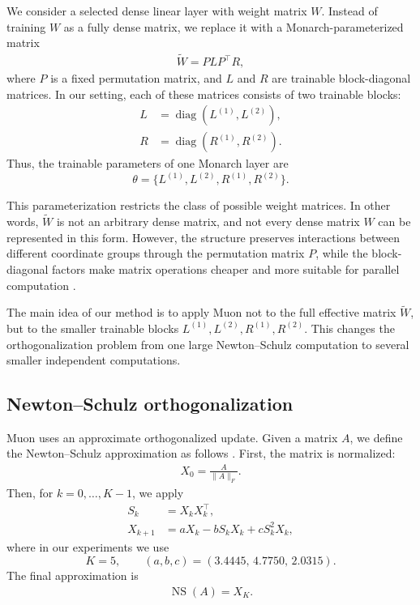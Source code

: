 \documentclass{article}
\begin{document}
We consider a selected dense linear layer with weight matrix \(W\). Instead of training \(W\) as a fully dense matrix, we replace it with a Monarch-parameterized matrix \cite{dao2022monarchexpressivestructuredmatrices}
\begin{align}
\widetilde{W} = P L P^\top R,
\end{align}
where \(P\) is a fixed permutation matrix, and \(L\) and \(R\) are trainable block-diagonal matrices. In our setting, each of these matrices consists of two trainable blocks:
\begin{align}
L &= \operatorname{diag}(L^{(1)}, L^{(2)}), \\
R &= \operatorname{diag}(R^{(1)}, R^{(2)}).
\end{align}
Thus, the trainable parameters of one Monarch layer are
\[
\theta = \{L^{(1)}, L^{(2)}, R^{(1)}, R^{(2)}\}.
\]

This parameterization restricts the class of possible weight matrices. In other words, \(\widetilde{W}\) is not an arbitrary dense matrix, and not every dense matrix \(W\) can be represented in this form. However, the structure preserves interactions between different coordinate groups through the permutation matrix \(P\), while the block-diagonal factors make matrix operations cheaper and more suitable for parallel computation \cite{dao2022monarchexpressivestructuredmatrices}.

The main idea of our method is to apply Muon not to the full effective matrix \(\widetilde{W}\), but to the smaller trainable blocks \(L^{(1)}, L^{(2)}, R^{(1)}, R^{(2)}\). This changes the orthogonalization problem from one large Newton--Schulz computation to several smaller independent computations.

\subsection{Newton--Schulz orthogonalization}

Muon uses an approximate orthogonalized update. Given a matrix \(A\), we define the Newton--Schulz approximation as follows \cite{jordan2024muon,liu2025muonscalablellmtraining}. First, the matrix is normalized:
\begin{align}
X_0 = \frac{A}{\lVert A \rVert_F}.
\end{align}
Then, for \(k = 0, \dots, K-1\), we apply
\begin{align}
S_k &= X_k X_k^\top, \\
X_{k+1} &= aX_k - bS_kX_k + cS_k^2X_k,
\end{align}
where in our experiments we use
\[
K = 5,
\qquad
(a,b,c) = (3.4445,\,4.7750,\,2.0315).
\]
The final approximation is
\begin{align}
\operatorname{NS}(A) = X_K.
\end{align}
\end{document}
